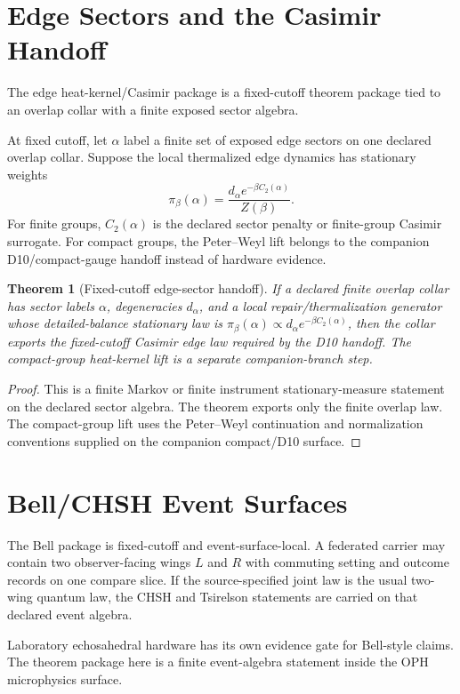 \documentclass[11pt]{article}
\newtheorem{theorem}{Theorem}[section]
\theoremstyle{remark}
\theoremstyle{plain}
\begin{document}
\section{Edge Sectors and the Casimir Handoff}

The edge heat-kernel/Casimir package is a fixed-cutoff theorem package tied to an overlap
collar with a finite exposed sector algebra.

At fixed cutoff, let \(\alpha\) label a finite set of exposed edge sectors on one declared
overlap collar. Suppose the local thermalized edge dynamics has stationary weights
\[
\pi_\beta(\alpha)=\frac{d_\alpha e^{-\beta C_2(\alpha)}}{Z(\beta)}.
\]
For finite groups, \(C_2(\alpha)\) is the declared sector penalty or finite-group Casimir
surrogate. For compact groups, the Peter--Weyl lift belongs to the companion D10/compact-gauge
handoff instead of hardware evidence.

\begin{theorem}[Fixed-cutoff edge-sector handoff]
If a declared finite overlap collar has sector labels \(\alpha\), degeneracies \(d_\alpha\), and
a local repair/thermalization generator whose detailed-balance stationary law is
\(\pi_\beta(\alpha)\propto d_\alpha e^{-\beta C_2(\alpha)}\), then the collar exports the
fixed-cutoff Casimir edge law required by the D10 handoff. The compact-group heat-kernel lift is a
separate companion-branch step.
\end{theorem}

\begin{proof}
This is a finite Markov or finite instrument stationary-measure statement on the declared sector
algebra. The theorem exports only the finite overlap law. The compact-group lift uses the
Peter--Weyl continuation and normalization conventions supplied on the companion compact/D10
surface.
\end{proof}

\section{Bell/CHSH Event Surfaces}

The Bell package is fixed-cutoff and event-surface-local. A federated carrier may contain two
observer-facing wings \(L\) and \(R\)
with commuting setting and outcome records on one compare slice. If the source-specified joint
law is the usual two-wing quantum law, the CHSH and Tsirelson statements are carried on that
declared event algebra.

Laboratory echosahedral hardware has its own evidence gate for Bell-style claims. The theorem
package here is a finite event-algebra statement inside the OPH microphysics surface.
\end{document}
